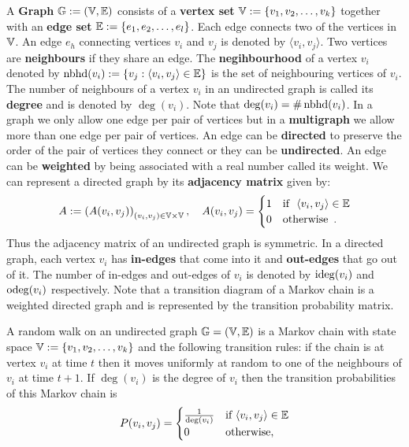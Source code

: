 {\begin{definition}[Graph]\label{D:Graph}
A {\bf Graph} $\mathbb{G} := (\mathbb{V},\mathbb{E})$ consists of a {\bf vertex set} $\mathbb{V} := \{v_1,v_2,\ldots,v_k\}$ together with an {\bf edge set} $\mathbb{E} := \{e_1,e_2,\ldots,e_l\}$.  Each edge connects two of the vertices in $\mathbb{V}$.  An edge $e_h$ connecting vertices $v_i$ and $v_j$ is denoted by $\langle v_i, v_j \rangle$.  Two vertices are {\bf neighbours} if they share an edge.  
The {\bf negihbourhood} of a vertex $v_i$ denoted by $\operatorname{nbhd}(v_i):=\left\{v_j : \langle v_i,v_j\rangle \in \mathbb{E} \right\}$ is the set of neighbouring vertices of $v_i$.  
The number of neighbours of a vertex $v_i$ in an undirected graph is called its {\bf degree} and is denoted by $\deg(v_i)$.  
Note that $\deg(v_i) = \# \operatorname{nbhd}(v_i)$.  
In a graph we only allow one edge per pair of vertices but in a {\bf multigraph} we allow more than one edge per pair of vertices.  
An edge can be {\bf directed} to preserve  the order of the pair of vertices they connect or they can be {\bf undirected}.  
An edge can be {\bf weighted} by being associated with a real number called its weight.  
We can represent a directed graph by its {\bf adjacency matrix} given by:
\[
A := \left( A(v_i,v_j) \right)_{(v_i,v_j) \in \mathbb{V} \times \mathbb{V}}, \quad 
A(v_i,v_j) = 
\begin{cases} 
1 & \text{if } \  \langle v_i, v_j \rangle \in \mathbb{E} \\
0 & \text{otherwise} \enspace .
\end{cases}
\]
Thus the adjacency matrix of an undirected graph is symmetric.  
In a directed graph, each vertex $v_i$ has {\bf in-edges} that come into it and {\bf out-edges} that go out of it.  
The number of in-edges and out-edges of $v_i$ is denoted by $\operatorname{ideg}(v_i)$ and $\operatorname{odeg}(v_i)$ respectively.  
Note that a transition diagram of a Markov chain is a weighted directed graph and is represented by the transition probability matrix.
\end{definition}

\begin{model}\label{M:RWGraph}
A random walk on an undirected graph $\mathbb{G}=(\mathbb{V},\mathbb{E})$ is a Markov chain with state space $\mathbb{V}:= \{v_1,v_2,\ldots,v_k\}$ and the following transition rules: if the chain is at vertex $v_i$ at time $t$ then it moves uniformly at random to one of the neighbours of $v_i$ at time $t+1$.  If $\deg(v_i)$ is the degree of $v_i$ then the transition probabilities of this Markov chain is
\[
P(v_i,v_j) = 
\begin{cases}
\frac{1}{\deg(v_i)} & \text{if $\langle v_i, v_j \rangle \in \mathbb{E}$}\\
0 & \text{otherwise} ,
\end{cases}
\]
\end{model}

}
